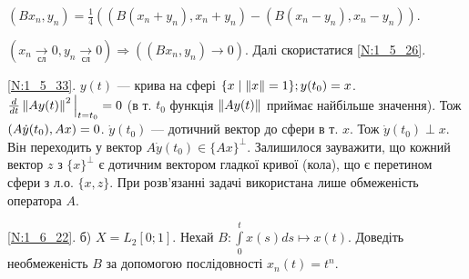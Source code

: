 \noindent$(B x_n, y_n) = \frac{1}{4}\left( (B(x_n+y_n), x_n+y_n) - (B(x_n - y_n), x_n - y_n)\right)$. 

 $(x_n \xrightarrow[\text{сл}]{} 0, y_n \xrightarrow[\text{сл}]{} 0) \Rightarrow ((B x_n, y_n) \rightarrow 0)$. Далі скористатися \ref{N:1_5_26}.

\noindent\ref{N:1_5_33}.
    $y(t)$ --- крива на сфері $\{x \mid \left\lVert x\right\rVert = 1\}; y(t_0) = x$. $\frac{d}{dt} \left\lVert A y(t)\right\rVert^2 \Big|_{t = t_0} = 0$
    (в т. $t_0$ функція $\left\lVert A y(t)\right\rVert$ приймає найбільше значення). Тож $\left(A \dot{y} (t_0), A x\right) = 0$.
    $\dot{y} (t_0)$ --- дотичний вектор до сфери в т. $x$. Тож $\dot{y} (t_0) \perp x$. 
Він переходить у вектор $A \dot{y} (t_0) \in \{Ax\}^{\perp}$. Залишилося зауважити, що кожний вектор $z$ з $\{x\}^{\perp}$ є дотичним вектором
гладкої кривої (кола), що є перетином сфери з л.о. $\{x, z\}$. При розв'язанні задачі використана лише обмеженість оператора $A$.

\noindent\ref{N:1_6_22}. б) $X = L_2 [0; 1]$. Нехай $B: \int\limits_0^t x(s) ds \mapsto x(t)$. Доведіть необмеженість
$B$ за допомогою послідовності $x_n(t) = t^n$.
